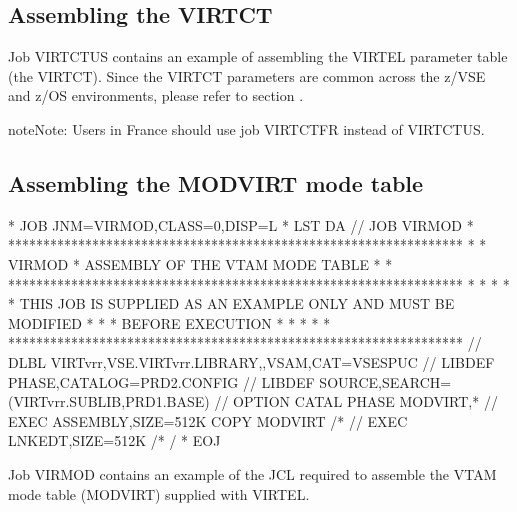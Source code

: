 \documentclass[letterpaper,10pt,english]{sphinxmanual}
\begin{document}
\subsection{Assembling the VIRTCT}
\label{\detokenize{Installation_Guide:assembling-the-virtct}}
\sphinxAtStartPar
Job VIRTCTUS contains an example of assembling the VIRTEL parameter table (the VIRTCT). Since the VIRTCT parameters are common across the z/VSE and z/OS environments, please refer to section {\hyperref[\detokenize{Installation_Guide:vvrrig-virtct}]{}}.

\begin{sphinxadmonition}{note}{Note:}
\sphinxAtStartPar
Users in France should use job VIRTCTFR instead of VIRTCTUS.
\end{sphinxadmonition}


\subsection{Assembling the MODVIRT mode table}
\label{\detokenize{Installation_Guide:assembling-the-modvirt-mode-table}}
\begin{sphinxVerbatim}[commandchars=\\\{\}]
* \PYGZdl{}\PYGZdl{} JOB JNM=VIRMOD,CLASS=0,DISP=L
* \PYGZdl{}\PYGZdl{} LST DA
// JOB VIRMOD
* *****************************************************************
* * VIRMOD * ASSEMBLY OF THE VTAM MODE TABLE *
* *****************************************************************
* * *
* * THIS JOB IS SUPPLIED AS AN EXAMPLE ONLY AND MUST BE MODIFIED *
* * BEFORE EXECUTION *
* * *
* *****************************************************************
// DLBL VIRTvrr,\PYGZsq{}VSE.VIRTvrr.LIBRARY\PYGZsq{},,VSAM,CAT=VSESPUC
// LIBDEF PHASE,CATALOG=PRD2.CONFIG
// LIBDEF SOURCE,SEARCH=(VIRTvrr.SUBLIB,PRD1.BASE)
// OPTION CATAL
  PHASE MODVIRT,*
// EXEC ASSEMBLY,SIZE=512K
  COPY MODVIRT
/*
// EXEC LNKEDT,SIZE=512K
/*
/\PYGZam{}
* \PYGZdl{}\PYGZdl{} EOJ
\end{sphinxVerbatim}

\sphinxAtStartPar
{}

\sphinxAtStartPar
Job VIRMOD contains an example of the JCL required to assemble the VTAM mode table (MODVIRT) supplied with VIRTEL.
\end{document}

